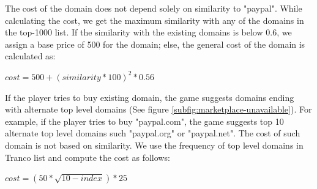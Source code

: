 The cost of the domain does not depend solely on similarity to "paypal". While calculating the cost, we get the maximum similarity with any of the domains in the top-1000 list. If the similarity with the existing domains is below 0.6, we assign a base price of 500 for the domain; else, the general cost of the domain is calculated as:
\begin{center}
    \begin{math}
        cost = 500 + (similarity *100)^2 * 0.56
    \end{math}
\end{center}

If the player tries to buy existing domain, the game suggests domains ending with alternate top level domains (See figure \ref{subfig:marketplace-unavailable}). For example, if the player tries to buy "paypal.com", the game suggests top 10 alternate top level domains such "paypal.org" or "paypal.net". The cost of such domain is not based on similarity. We use the frequency of top level domains in Tranco list and compute the cost as follows:

\begin{center}
    \begin{math}
        cost = (50 * \sqrt{10-index}) *25
    \end{math}
\end{center}



